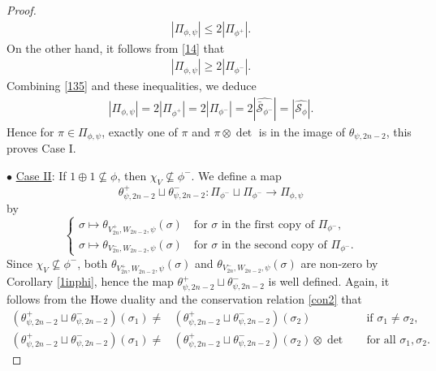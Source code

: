 \documentclass[article]{article}
\numberwithin{equation}{section}
\theoremstyle{definition}
\begin{document}
\begin{proof}
		\begin{align*}
		|\Pi_{\phi,\psi}|\leq 2|\Pi_{\phi^{+}}|. 
		\end{align*}
		On the other hand, it follows from \ref{14} that 
		\begin{align*}
		|\Pi_{\phi,\psi}|\geq 2|\Pi_{\phi^{-}}|. 
		\end{align*}
		Combining \ref{135} and these inequalities, we deduce  
		\begin{align*}
		|\Pi_{\phi,\psi}|=2|\Pi_{\phi^{+}}|=  2|\Pi_{\phi^{-}}|=2|\widehat{\bar {\mathcal S}_{\phi^{-}}}|=|\widehat{\mathcal {S}_{\phi}}|. 
		\end{align*}
		Hence for $\pi\in \Pi_{\phi,\psi}$, exactly one of $\pi$ and $\pi\otimes\det$ is in the image of $\theta_{\psi,2n-2}$, this proves Case I. 
	
	$\bullet$ \underline{Case II}: If $\mathrm{1}\oplus\mathrm{1}\nsubseteq \phi$, then $\chi_{V}\nsubseteq \phi^{-}$. We define a map 
		\begin{equation}\label{theta2n-22}
		\theta_{\psi,2n-2}^{+}\sqcup\theta_{\psi,2n-2}^{-}: \Pi_{\phi^{-}}\sqcup \Pi_{\phi^{-}} \longrightarrow \Pi_{\phi,\psi}
		\end{equation}
		by 
		$$
		\begin{cases*}
		\sigma\mapsto  \theta_{V^{+}_{2n},W_{2n-2},\psi}(\sigma)\quad \mbox{for $\sigma$ in the first copy of $\Pi_{\phi^{-}}$},\\
		\sigma\mapsto \theta_{V^{-}_{2n},W_{2n-2},\psi}(\sigma) \quad \mbox{for $\sigma$ in the second copy of $\Pi_{\phi^{-}}$}. 
		\end{cases*}
		$$
		Since $\chi_{V}\nsubseteq \phi^{-}$, both $\theta_{V^{+}_{2n},W_{2n-2},\psi}(\sigma)$ and $\theta_{V^{-}_{2n},W_{2n-2},\psi}(\sigma)$ are non-zero by Corollary \ref{1inphi}, hence the map $\theta_{\psi,2n-2}^{+}\sqcup\theta_{\psi,2n-2}^{-}$ is well defined. Again, it follows from the Howe duality and the conservation relation \ref{con2} that 
		\begin{equation}\label{16}
	\begin{aligned}
	\left(\theta_{\psi,2n-2}^{+}\sqcup\theta_{\psi,2n-2}^{-}\right)(\sigma_1)\neq& \left(\theta_{\psi,2n-2}^{+}\sqcup\theta_{\psi,2n-2}^{-}\right)(\sigma_2)\quad &	\mbox{if}\,\, \sigma_1\neq \sigma_2,\\
	\left(\theta_{\psi,2n-2}^{+}\sqcup\theta_{\psi,2n-2}^{-}\right)(\sigma_1)\neq& \left(\theta_{\psi,2n-2}^{+}\sqcup\theta_{\psi,2n-2}^{-}\right)(\sigma_2)\otimes \det\quad &
	\mbox{for all}\,\, \sigma_1, \sigma_2. 
	\end{aligned}

\end{equation}
\end{proof}
\end{document}
